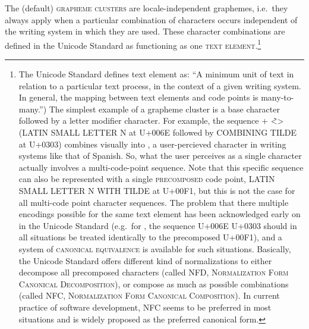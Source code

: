{{{{{{{{{{{{{{The (default) \textsc{grapheme clusters} are locale-independent graphemes, i.e.~they always apply when a particular combination of characters occurs independent of the writing system in which they are used. These character combinations are defined in the Unicode Standard as functioning as one \textsc{text element}.\footnote{The Unicode Standard defines text element as: ``A minimum unit of text in relation to a particular text process, in the context of a given writing system. In general, the mapping between text elements and code points is many-to-many.'') The simplest example of a grapheme cluster is a base character followed by a letter modifier character. For example, the sequence + <̃\textgreater{} (LATIN SMALL LETTER N at U+006E followed by COMBINING TILDE at U+0303) combines visually into , a user-percieved character in writing systems like that of Spanish. So, what the user perceives as a single character actually involves a multi-code-point sequence. Note that this specific sequence can also be represented with a single \textsc{precomposed} code point, LATIN SMALL LETTER N WITH TILDE at U+00F1, but this is not the case for all multi-code point character sequences. The problem that there multiple encodings possible for the same text element has been acknowledged early on in the Unicode Standard (e.g.~for , the sequence U+006E U+0303 should in all situations be treated identically to the precomposed U+00F1), and a system of \textsc{canonical equivalence} is available for such situations. Basically, the Unicode Standard offers different kind of normalizations to either decompose all precomposed characters (called \textsc{NFD}, \textsc{Normalization Form Canonical Decomposition}), or compose as much as possible combinations (called \textsc{NFC}, \textsc{Normalization Form Canonical Composition}). In current practice of software development, NFC seems to be preferred in most situations and is widely proposed as the preferred canonical form.

}}}}}}}}}}}}}}}
